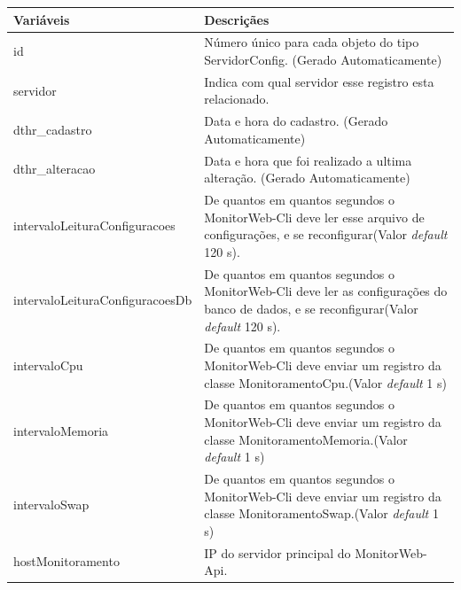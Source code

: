 \begin{table}[!ht]
\centering
\begin{tabular}{|l|l|}
\hline
{\color[HTML]{000000} \textbf{Variáveis}} & {\color[HTML]{000000} \textbf{Descriçães}} \\ \hline
id                                     & \multicolumn{1}{p{10.00cm}|}{Número único para cada objeto do tipo ServidorConfig. (Gerado Automaticamente)} \\ \hline
servidor                               & \multicolumn{1}{p{10.00cm}|}{Indica com qual servidor esse registro esta relacionado.}
\\ \hline
dthr\_cadastro                         & \multicolumn{1}{p{10.00cm}|}{Data e hora do cadastro. (Gerado Automaticamente)}\\ \hline
dthr\_alteracao                        & \multicolumn{1}{p{10.00cm}|}{Data e hora que foi realizado a ultima alteração. (Gerado Automaticamente)}\\ \hline
intervaloLeituraConfiguracoes          & \multicolumn{1}{p{10.00cm}|}{De quantos em quantos segundos o MonitorWeb-Cli deve ler esse arquivo de configurações, e se reconfigurar(Valor \textit{default} 120 s).} \\ \hline
intervaloLeituraConfiguracoesDb        & \multicolumn{1}{p{10.00cm}|}{De quantos em quantos segundos o MonitorWeb-Cli deve ler as configurações do banco de dados, e se reconfigurar(Valor \textit{default} 120 s).} \\ \hline
intervaloCpu                           & \multicolumn{1}{p{10.00cm}|}{De quantos em quantos segundos o MonitorWeb-Cli deve enviar um registro da classe MonitoramentoCpu.(Valor \textit{default} 1 s)}\\ \hline
intervaloMemoria                       & \multicolumn{1}{p{10.00cm}|}{De quantos em quantos segundos o MonitorWeb-Cli deve enviar um registro da classe MonitoramentoMemoria.(Valor \textit{default} 1 s)}\\ \hline
intervaloSwap                          & \multicolumn{1}{p{10.00cm}|}{De quantos em quantos segundos o MonitorWeb-Cli deve enviar um registro da classe MonitoramentoSwap.(Valor \textit{default} 1 s)} \\ \hline
hostMonitoramento                      & \multicolumn{1}{p{10.00cm}|}{IP do servidor principal do MonitorWeb-Api.}\\ \hline

\end{tabular}
\end{table}
